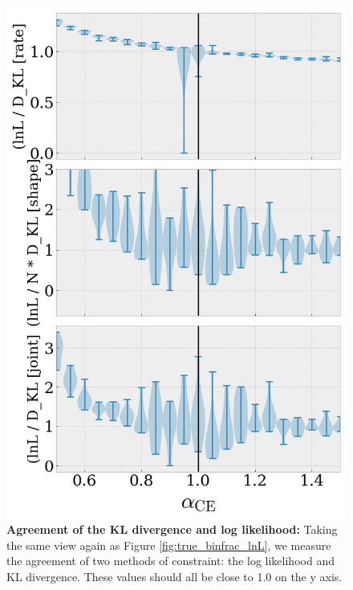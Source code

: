 \documentclass[twocolumn]{aastex631}
\begin{document}
\begin{figure}
\includegraphics[width=3.375 in]{CEb60_m12i-000_inj_KL_criteria.png}
\caption{\label{fig:true_binfrac_criteria}
    \textbf{Agreement of the KL divergence and log likelihood:}
Taking the same view again as Figure \ref{fig:true_binfrac_lnL},
    we measure the agreement of two methods of constraint:
    the log likelihood and KL divergence.
These values should all be close to 1.0 on the y axis.
}
\end{figure}
\end{document}
